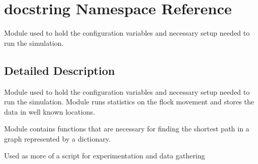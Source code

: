 \hypertarget{namespacedocstring}{\section{docstring Namespace Reference}
\label{namespacedocstring}
}


Module used to hold the configuration variables and necessary setup needed to run the simulation.  




\subsection{Detailed Description}
Module used to hold the configuration variables and necessary setup needed to run the simulation. Module runs statistics on the flock movement and stores the data in well known locations.

Module contains functions that are necessary for finding the shortest path in a graph represented by a dictionary.

Used as more of a script for experimentation and data gathering 